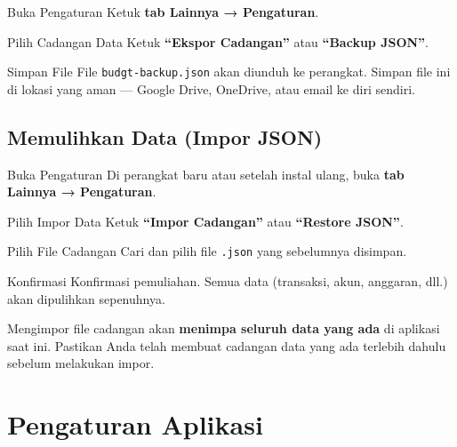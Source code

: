 \documentclass[12pt, a4paper]{article}
\begin{document}
\begin{stepbox}{Buka Pengaturan}
  Ketuk \textbf{tab Lainnya → Pengaturan}.
\end{stepbox}

\begin{stepbox}{Pilih Cadangan Data}
  Ketuk \textbf{``Ekspor Cadangan''} atau \textbf{``Backup JSON''}.
\end{stepbox}

\begin{stepbox}{Simpan File}
  File \texttt{budgt-backup.json} akan diunduh ke perangkat. Simpan file ini di lokasi yang aman --- Google Drive, OneDrive, atau email ke diri sendiri.
\end{stepbox}

\subsection{Memulihkan Data (Impor JSON)}

\begin{stepbox}{Buka Pengaturan}
  Di perangkat baru atau setelah instal ulang, buka \textbf{tab Lainnya → Pengaturan}.
\end{stepbox}

\begin{stepbox}{Pilih Impor Data}
  Ketuk \textbf{``Impor Cadangan''} atau \textbf{``Restore JSON''}.
\end{stepbox}

\begin{stepbox}{Pilih File Cadangan}
  Cari dan pilih file \texttt{.json} yang sebelumnya disimpan.
\end{stepbox}

\begin{stepbox}{Konfirmasi}
  Konfirmasi pemuliahan. Semua data (transaksi, akun, anggaran, dll.) akan dipulihkan sepenuhnya.
\end{stepbox}

\begin{warnbox}
Mengimpor file cadangan akan \textbf{menimpa seluruh data yang ada} di aplikasi saat ini. Pastikan Anda telah membuat cadangan data yang ada terlebih dahulu sebelum melakukan impor.
\end{warnbox}

\section{Pengaturan Aplikasi}
\end{document}
